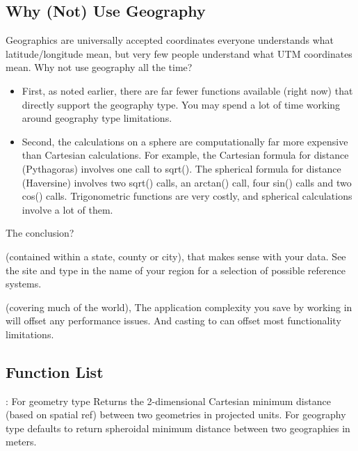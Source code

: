 \documentclass[a4paper,11pt,english]{sphinxmanual}
\begin{document}
\subsection{Why (Not) Use Geography}
\label{\detokenize{basic:why-not-use-geography}}
Geographics are universally accepted coordinates \textendash{} everyone understands what latitude/longitude mean, but very few people understand what UTM coordinates mean. Why not use geography all the time?
\begin{itemize}
\item {} 
First, as noted earlier, there are far fewer functions available (right now) that directly support the geography type. You may spend a lot of time working around geography type limitations.

\item {} 
Second, the calculations on a sphere are computationally far more expensive than Cartesian calculations. For example, the Cartesian formula for distance (Pythagoras) involves one call to sqrt(). The spherical formula for distance (Haversine) involves two sqrt() calls, an arctan() call, four sin() calls and two cos() calls. Trigonometric functions are very costly, and spherical calculations involve a lot of them.

\end{itemize}

The conclusion?

 (contained within a state, county or city),  that makes sense with your data. See the  site and type in the name of your region for a selection of possible reference systems.

 (covering much of the world),  The application complexity you save by working in  will offset any performance issues. And casting to  can offset most functionality limitations.


\subsection{Function List}
\label{\detokenize{basic:id30}}
: For geometry type Returns the 2-dimensional Cartesian minimum distance (based on spatial ref) between two geometries in projected units. For geography type defaults to return spheroidal minimum distance between two geographies in meters.
\end{document}
